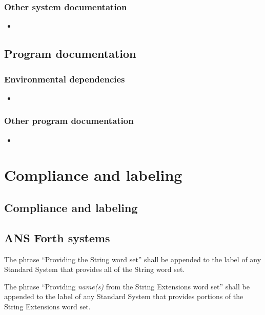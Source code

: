 \subsubsection{Other system documentation}
\begin{itemize}
\item {}
\end{itemize}

\subsection{Program documentation}

\subsubsection{Environmental dependencies}
\begin{itemize}
\item {}
\end{itemize}

\subsubsection{Other program documentation}
\begin{itemize}
\item {}
\end{itemize}

\section{Compliance and labeling} %

\subsection{Compliance and labeling} %

\cbstart{}
\subsection[Forth systems]{ANS Forth systems} %
\cbend

The phrase ``Providing the String word set'' shall be appended to
the label of any Standard System that provides all of the String
word set.

The phrase ``Providing \emph{name(s)} from the String Extensions
word set'' shall be appended to the label of any Standard System
that provides portions of the String Extensions word set.

